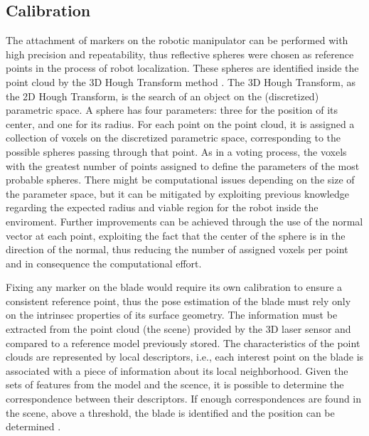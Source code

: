 \subsection{Calibration}
 

   
The attachment of markers on the robotic manipulator can be performed with high
precision and repeatability, thus reflective spheres were chosen as reference
points in the process of robot localization. These spheres are identified inside
the point cloud by the 3D Hough Transform method \cite{camurri20143d}. The 3D
Hough Transform, as the 2D Hough Transform, is the search of an object on the
(discretized) parametric space. A sphere has four parameters: three for the
position of its center, and one for its radius. For each point on the point
cloud, it is assigned a collection of voxels on the discretized parametric
space, corresponding to the possible spheres passing through that point. As in a
voting process, the voxels with the greatest number of points assigned to define
the parameters of the most probable spheres. There might be computational issues
depending on the size of the parameter space, but it can be mitigated by
exploiting previous knowledge regarding the expected radius and viable region
for the robot inside the enviroment. Further improvements can be achieved
through the use of the normal vector at each point, exploiting the fact that
the center of the sphere is in the direction of the normal, thus reducing the
number of assigned voxels per point and in consequence the computational effort.

Fixing any marker on the blade would require its own calibration to ensure a
consistent reference point, thus the pose estimation of the blade must rely only
on the intrinsec properties of its surface geometry. The information must be extracted from
the point cloud (the scene) provided by the 3D laser sensor and
compared to a reference model previously stored. The characteristics of the point clouds are represented
by local descriptors, i.e., each interest point on the blade is associated
with a piece of information about its local neighborhood. Given the
sets of features from the model and the scence,  it is possible to determine the
correspondence between their descriptors. If enough correspondences are found
in the scene, above a threshold, the blade is identified and the position can be
determined \cite{Tombari2010a}.


